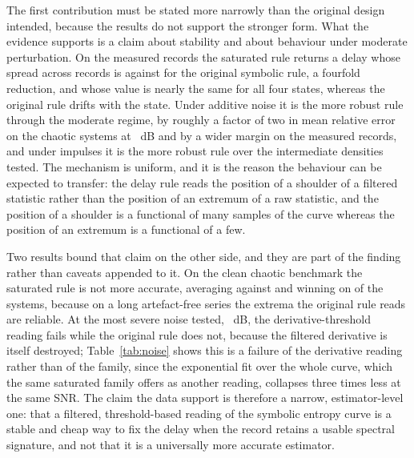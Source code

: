 \documentclass[10pt,a4paper,twocolumn]{article}
\begin{document}
The first contribution must be stated more narrowly than the original design
intended, because the results do not support the stronger form.  What the
evidence supports is a claim about stability and about behaviour under
moderate perturbation.  On the measured records the saturated rule returns a
delay whose spread across records is \rotorTauStdLPF{} against
\rotorTauStdSE{} for the original symbolic rule, a fourfold reduction, and
whose value is nearly the same for all four states, whereas the original rule
drifts with the state.  Under additive noise it is the more robust rule
through the moderate regime, by roughly a factor of two in mean relative error
on the chaotic systems at \snrMid{}~dB and by a wider margin on the measured
records, and under impulses it is the more robust rule over the intermediate
densities tested.  The mechanism is uniform, and it is the reason the
behaviour can be expected to transfer: the delay rule reads the position of a
shoulder of a filtered statistic rather than the position of an extremum of a
raw statistic, and the position of a shoulder is a functional of many samples
of the curve whereas the position of an extremum is a functional of a few.

Two results bound that claim on the other side, and they are part of the
finding rather than caveats appended to it.  On the clean chaotic benchmark
the saturated rule is not more accurate, averaging \chaosTauLPF{} against
\chaosTauSE{} and winning on \chaosWinLPF{} of the \nSystems{} systems,
because on a long artefact-free series the extrema the original rule reads
are reliable.  At the most severe noise tested, \snrLow{}~dB, the
derivative-threshold reading fails while the original rule does not, because
the filtered derivative is itself destroyed; Table~\ref{tab:noise} shows this
is a failure of the derivative reading rather than of the family, since the
exponential fit over the whole curve, which the same saturated family offers
as another reading, collapses three times less at the same SNR.  The claim
the data support is therefore a narrow, estimator-level
one: that a filtered, threshold-based reading of the symbolic entropy curve is
a stable and cheap way to fix the delay when the record retains a usable
spectral signature, and not that it is a universally more accurate estimator.
\end{document}
